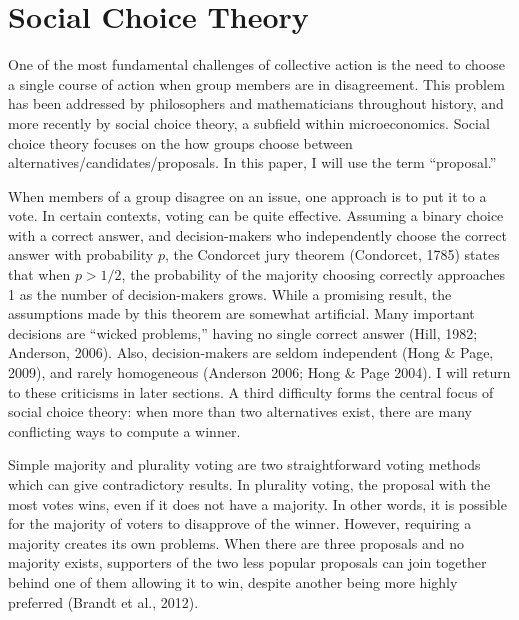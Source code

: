 \section{Social Choice Theory}
One of the most fundamental challenges of collective action is the need to choose a single course of action when group members are in disagreement. This problem has been addressed by philosophers and mathematicians throughout history, and more recently by social choice theory, a subfield within microeconomics. Social choice theory focuses on the how groups choose between alternatives/candidates/proposals. In this paper, I will use the term ``proposal.''

When members of a group disagree on an issue, one approach is to put it to a vote. In certain contexts, voting can be quite effective. Assuming a binary choice with a correct answer, and decision-makers who independently choose the correct answer with probability $p$, the Condorcet jury theorem (Condorcet, 1785) states that when $p > 1/2$, the probability of the majority choosing correctly approaches 1 as the number of decision-makers grows. While a promising result, the assumptions made by this theorem are somewhat artificial. Many important decisions are ``wicked problems,'' having no single correct answer (Hill, 1982; Anderson, 2006). Also, decision-makers are seldom independent (Hong \& Page, 2009), and rarely homogeneous (Anderson 2006; Hong \& Page 2004). I will return to these criticisms in later sections. A third difficulty forms the central focus of social choice theory: when more than two alternatives exist, there are many conflicting ways to compute a winner.

Simple majority and plurality voting are two straightforward voting methods which can give contradictory results. In plurality voting, the proposal with the most votes wins, even if it does not have a majority. In other words, it is possible for the majority of voters to disapprove of the winner. However, requiring a majority creates its own problems. When there are three proposals and no majority exists, supporters of the two less popular proposals can join together behind one of them allowing it to win, despite another being more highly preferred (Brandt et al., 2012).

